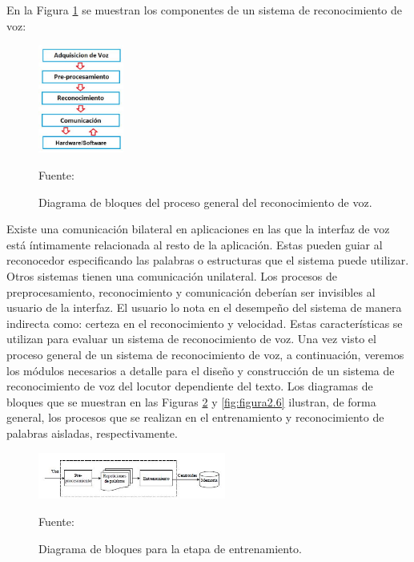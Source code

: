 En la Figura \ref{fig:figura2.4} se muestran los componentes de un sistema de reconocimiento de voz:

\begin{figure}[ht]
\begin{center}
\includegraphics[width=0.25\textwidth]{Imagenes/Cap2/image004}
\end{center}
\begin{center}
\vskip -0.5cm
\caption{\small{Diagrama de bloques del proceso general del reconocimiento de voz.}}
\label{fig:figura2.4}
{\small{Fuente: \cite{eyra}}}
\end{center}
\end{figure}

Existe una comunicación bilateral en aplicaciones en las que la interfaz de voz está íntimamente relacionada al resto de la aplicación. Estas pueden guiar al reconocedor especificando las palabras o estructuras que el sistema puede utilizar. Otros sistemas tienen una comunicación unilateral.
\vskip 0.5cm
Los procesos de preprocesamiento, reconocimiento y comunicación deberían ser invisibles al usuario de la interfaz. El usuario lo nota en el desempeño del sistema de manera indirecta como: certeza en el reconocimiento y velocidad. Estas características se utilizan para evaluar un sistema de reconocimiento de voz.
\vskip 0.5cm
Una vez visto el proceso general de un sistema de reconocimiento de voz, a continuación, veremos los módulos necesarios a detalle para el diseño y construcción de un sistema de reconocimiento de voz del locutor dependiente del texto. 
\vskip 0.5cm
Los diagramas de bloques que se muestran en las Figuras \ref{fig:figura2.5} y \ref{fig:figura2.6} ilustran, de forma general, los procesos que se realizan en el entrenamiento y reconocimiento de palabras aisladas, respectivamente.

\begin{figure}[ht]
\begin{center}
\includegraphics[width=0.55\textwidth]{Imagenes/Cap2/image005}
\end{center}
\begin{center}
\vskip -0.5cm
\caption{\small{Diagrama de bloques para la etapa de entrenamiento.}}
\label{fig:figura2.5}
{\small{Fuente: \cite{navarrete}}}
\end{center}
\end{figure}

